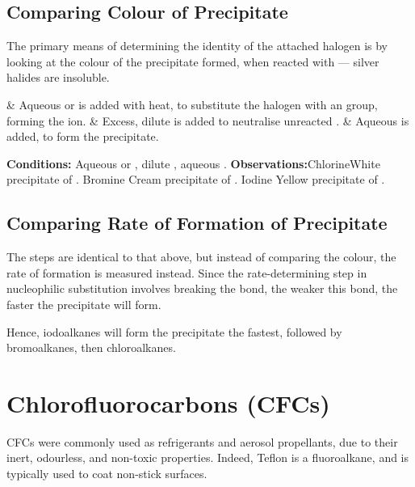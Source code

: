 		\subsection{Comparing Colour of Precipitate}
			The primary means of determining the identity of the attached halogen is by looking at the colour of the precipitate formed, when
			reacted with  –– silver halides are insoluble.

			\begin{numberedlist}
				&	Aqueous  or  is added with heat, to substitute the halogen with an  group, forming the  ion.
				&	Excess, dilute  is added to neutralise unreacted .
				&	Aqueous  is added, to form the  precipitate.
			\end{numberedlist}

			\vspace{1.5em}
			\vbox{\textbf{Conditions:}	\tabto{35mm}Aqueous  or , dilute , aqueous .}\vspace{0.5em}
			\vbox{\textbf{Observations:}\tabto{35mm}Chlorine\tabto{60mm}White precipitate of .
										\tabto{35mm}Bromine	\tabto{60mm}Cream precipitate of .
										\tabto{35mm}Iodine	\tabto{60mm}Yellow precipitate of .}

		\subsection{Comparing Rate of Formation of Precipitate}

			The steps are identical to that above, but instead of comparing the colour, the rate of formation is measured instead. Since the
			rate-determining step in nucleophilic substitution involves breaking the  bond, the weaker this bond, the faster the
			precipitate will form.

			Hence, iodoalkanes will form the precipitate the fastest, followed by bromoalkanes, then chloroalkanes.



	\pagebreak
	\section{Chlorofluorocarbons (CFCs)}

		CFCs were commonly used as refrigerants and aerosol propellants, due to their inert, odourless, and non-toxic properties.
		Indeed, Teflon is a fluoroalkane, and is typically used to coat non-stick surfaces.

